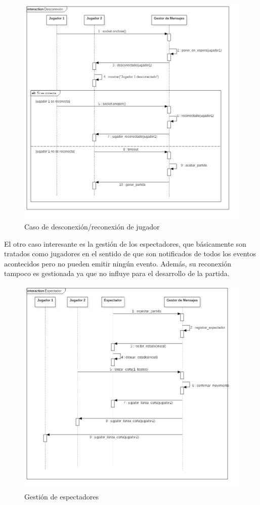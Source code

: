 \begin{figure}[H]
  \includegraphics[width=\linewidth]{figuras/diagramasSecuencia/desconexion.png}
  \caption{Caso de desconexión/reconexión de jugador}
  \label{fig:desconexion}
\end{figure}

El otro caso interesante es la gestión de los espectadores, que básicamente son tratados como jugadores en el sentido de que son
notificados de todos los eventos acontecidos pero no pueden emitir ningún evento. Además, su reconexión tampoco es gestionada
ya que no influye para el desarrollo de la partida.\\

\begin{figure}[H]
  \includegraphics[width=\linewidth]{figuras/diagramasSecuencia/espectador.png}
  \caption{Gestión de espectadores}
  \label{fig:espectador}
\end{figure}

